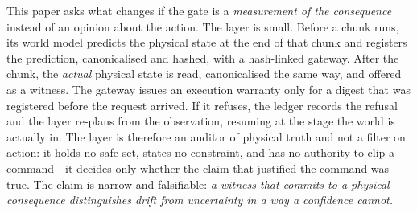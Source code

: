 \documentclass[conference]{IEEEtran}
\theoremstyle{definition}
\begin{document}
This paper asks what changes if the gate is a \emph{measurement of the
consequence} instead of an opinion about the action. The layer is small. Before
a chunk runs, its world model predicts the physical state at the end of that
chunk and registers the prediction, canonicalised and hashed, with a
hash-linked gateway. After the chunk, the \emph{actual} physical state is read,
canonicalised the same way, and offered as a witness. The gateway issues an
execution warranty only for a digest that was registered before the request
arrived. If it
refuses, the ledger records the refusal and the layer re-plans from the
observation, resuming at the stage the world is actually in. The layer is
therefore an auditor of physical truth and not a filter on action: it holds no
safe set, states no constraint, and has no authority to clip a command---it
decides only whether the claim that justified the command was true. The claim is
narrow and falsifiable: \emph{a witness that commits to a physical consequence
distinguishes drift from uncertainty in a way a confidence cannot.}
\end{document}
